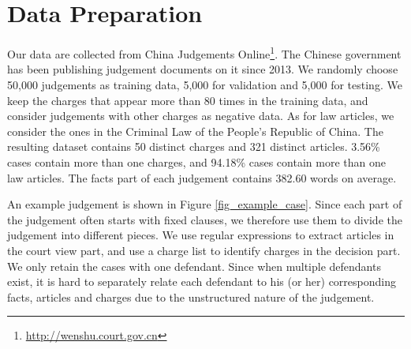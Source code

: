 \section{Data Preparation} 
Our data are collected from China Judgements Online\footnote{\url{http://wenshu.court.gov.cn}}. The Chinese government has been publishing judgement documents on it since 2013.
We randomly choose 50,000 judgements as training data, 5,000 for validation and 5,000 for testing. We keep the charges that appear more than 80 times in the training data, and consider judgements with other charges as negative data. As for law articles, we consider the ones in the Criminal Law of the People's Republic of China. The resulting dataset contains 50 distinct charges and 321 distinct articles. 3.56\% cases contain more than one charges, and 94.18\% cases contain more than one law articles. 
The facts part of each judgement contains 382.60 words on average.

An example judgement is shown in Figure \ref{fig_example_case}. Since each part of the judgement often starts with fixed clauses, we therefore use them to divide the judgement into different pieces. 
We use regular expressions to extract articles in the court view part, and use a charge list to identify charges in the decision part.
We only retain the cases with one defendant. Since when multiple defendants exist, it is hard to separately relate each defendant to his (or her) corresponding facts, articles and charges due to the unstructured nature of the judgement.





